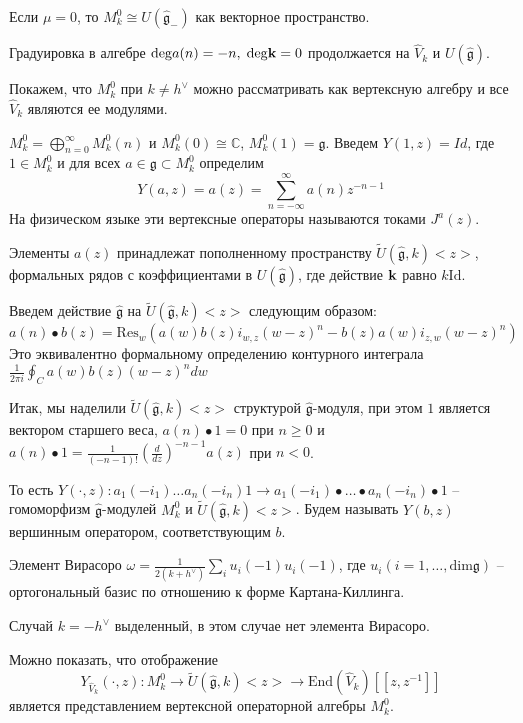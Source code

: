 \documentclass[12pt]{article}
\newcommand{\gf}{\mathfrak{g}}
\newcommand{\gfh}{\hat{\mathfrak{g}}}
\begin{document}
Если $\mu=0$, то $M^0_k\cong U(\gfh_-)$ как векторное пространство. 

Градуировка в алгебре $\mathrm{deg} a(n)=-n, \; \mathrm{deg} {\bf k}=0$ 
продолжается на $\hat{V}_k$ и $U(\gfh)$.

Покажем, что $M^0_k$ при $k\neq h^{\vee}$ можно рассматривать как вертексную
алгебру и все $\hat{V}_k$ являются ее модулями. 

$M^0_k=\bigoplus_{n=0}^{\infty} M^0_k(n)$ и $M^0_k(0)\cong \mathbb{C}$,
$M^0_k(1)=\gf$. Введем $Y(1,z)=Id$, где $1\in M^0_k$ и для всех $a\in \gf\subset
M^0_k$ определим
\begin{equation}
  \label{eq:2}
  Y(a,z)=a(z)=\sum_{n=-\infty}^{\infty} a(n) z^{-n-1}
\end{equation}
На физическом языке эти вертексные операторы называются токами $J^a(z)$.

Элементы $a(z)$ принадлежат пополненному пространству $\tilde{U}(\gfh,k)<z>$, формальных
рядов с коэффициентами в $U(\gfh)$, где действие ${\bf k}$ равно $k
\mathrm{Id}$.

Введем действие $\gfh$ на $\tilde{U}(\gfh,k)<z>$ следующим образом:
\begin{equation}
  \label{eq:3}
  a(n)\bullet b(z)=\mathrm{Res}_w \left(a(w)b(z)i_{w,z}(w-z)^n - b(z)a(w) i_{z,w}(w-z)^n\right)
\end{equation}
Это эквивалентно формальному определению контурного интеграла $\frac{1}{2\pi i }
\oint_C a(w) b(z) (w-z)^n dw$

Итак, мы наделили  $\tilde{U}(\gfh,k)<z>$ структурой $\gfh$-модуля, при этом
$1$ является вектором старшего веса, $a(n)\bullet 1=0$ при $n\geq 0$ и
$a(n)\bullet 1=\frac{1}{(-n-1)!}\left(\frac{d}{dz}\right)^{-n-1}a(z)$ при $n<0$. 

То есть $Y(\cdot, z): a_1 (-i_1)\dots a_n(-i_n)1\to a_1(-i_1)\bullet\dots\bullet
a_n(-i_n)\bullet 1$ -- гомоморфизм $\gfh$-модулей $M^0_k$ и
$\tilde{U}(\gfh,k)<z>$. Будем называть $Y(b,z)$ вершинным оператором,
соответствующим $b$.

Элемент Вирасоро $\omega=\frac{1}{2(k+h^{\vee})}\sum_i u_i(-1) u_i(-1)$, где
$u_i (i=1,\dots,\mathrm{dim}\gf)$ -- ортогональный базис по отношению к форме
Картана-Киллинга. 

Случай $k=-h^{\vee}$ выделенный, в этом случае нет элемента Вирасоро.

Можно показать, что отображение
 $$Y_{\hat{V}_k}(\cdot,z):M^0_k\to
\tilde{U}(\gfh,k)<z> \to \mathrm{End}(\hat{V}_k)[[z,z^{-1}]]$$
является представлением вертексной операторной алгебры $M^0_k$.
\end{document}
